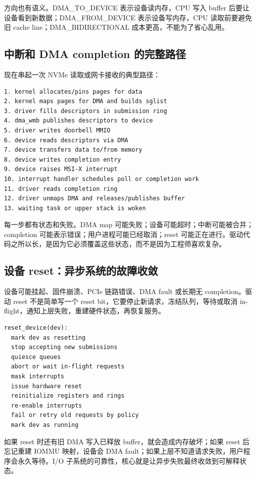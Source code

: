 方向也有语义。DMA\_TO\_DEVICE 表示设备读内存，CPU 写入 buffer 后要让设备看到新数据；DMA\_FROM\_DEVICE 表示设备写内存，CPU 读取前要避免旧 cache line；DMA\_BIDIRECTIONAL 成本更高，不能为了省心乱用。

\subsection{中断和 DMA completion 的完整路径}

现在串起一次 NVMe 读取或网卡接收的典型路径：

\begin{lstlisting}
1. kernel allocates/pins pages for data
2. kernel maps pages for DMA and builds sglist
3. driver fills descriptors in submission ring
4. dma_wmb publishes descriptors to device
5. driver writes doorbell MMIO
6. device reads descriptors via DMA
7. device transfers data to/from memory
8. device writes completion entry
9. device raises MSI-X interrupt
10. interrupt handler schedules poll or completion work
11. driver reads completion ring
12. driver unmaps DMA and releases/publishes buffer
13. waiting task or upper stack is woken
\end{lstlisting}

每一步都有状态和失败。DMA map 可能失败；设备可能超时；中断可能被合并；completion 可能表示错误；用户进程可能已经取消；reset 可能正在进行。驱动代码之所以长，是因为它必须覆盖这些状态，而不是因为工程师喜欢复杂。

\subsection{设备 reset：异步系统的故障收敛}

设备可能挂起、固件崩溃、PCIe 链路错误、DMA fault 或长期无 completion。驱动 reset 不是简单写一个 reset bit，它要停止新请求，冻结队列，等待或取消 in-flight，通知上层失败，重建硬件状态，再恢复服务。

\begin{lstlisting}
reset_device(dev):
  mark dev as resetting
  stop accepting new submissions
  quiesce queues
  abort or wait in-flight requests
  mask interrupts
  issue hardware reset
  reinitialize registers and rings
  re-enable interrupts
  fail or retry old requests by policy
  mark dev as running
\end{lstlisting}

如果 reset 时还有旧 DMA 写入已释放 buffer，就会造成内存破坏；如果 reset 后忘记重建 IOMMU 映射，设备会 DMA fault；如果上层不知道请求失败，用户程序会永久等待。I/O 子系统的可靠性，核心就是让异步失败最终收敛到可解释状态。


